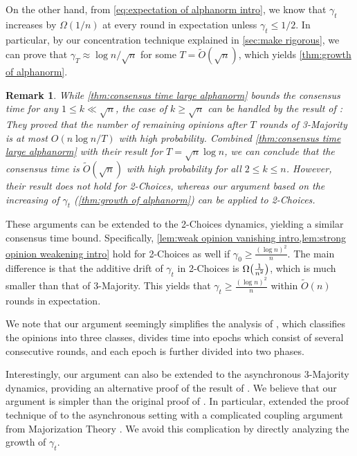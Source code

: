 \documentclass[letterpaper,11pt]{article}
\newtheorem{remark}[theorem]{Remark}
\newcommand{\Otilde}{\widetilde{O}}
\newcommand{\alphanorm}{\gamma}
\begin{document}
On the other hand, from \cref{eq:expectation of alphanorm intro}, we know that $\alphanorm_t$ increases by $\Omega(1/n)$ at every round in expectation unless $\alphanorm_t \le 1/2$.
In particular, by our concentration technique explained in \cref{sec:make rigorous}, we can prove that $\alphanorm_T \approx \log n/\sqrt{n}$ for some $T=\Otilde(\sqrt{n})$, which yields \cref{thm:growth of alphanorm}.


\begin{remark}
  While \cref{thm:consensus time large alphanorm} bounds the consensus time for any $1\le k\ll \sqrt{n}$,
  the case of $k \ge \sqrt{n}$ can be handled by the result of \cite{ignore_or_comply}:
  They proved that the number of remaining opinions after $T$ rounds of 3-Majority is at most $O(n\log n / T)$ with high probability.
  Combined \cref{thm:consensus time large alphanorm} with their result for $T=\sqrt{n}\log n$, we can conclude that the consensus time is $\Otilde(\sqrt{n})$ with high probability for all $2\le k\le n$.
  However, their result does not hold for 2-Choices, whereas our argument based on the increasing of $\alphanorm_t$ (\cref{thm:growth of alphanorm}) can be applied to 2-Choices.
\end{remark}

These arguments can be extended to the 2-Choices dynamics, yielding a similar consensus time bound.
Specifically, \cref{lem:weak opinion vanishing intro,lem:strong opinion weakening intro} hold for 2-Choices as well if $\alphanorm_0 \ge \frac{(\log n)^2}{n}$.
The main difference is that the additive drift of $\alphanorm_t$ in 2-Choices is $\Omega\qty(\frac{1}{n^2})$, which is much smaller than that of 3-Majority.
This yields that $\alphanorm_t \ge \frac{(\log n)^2}{n}$ within $\Otilde(n)$ rounds in expectation.


We note that our argument seemingly simplifies the analysis of \cite{nearly_tight_analysis}, which classifies the opinions into three classes, divides time into epochs which consist of several consecutive rounds, and each epoch is further divided into two phases.

Interestingly, our argument can also be extended to the asynchronous 3-Majority dynamics, providing an alternative proof of the result of \cite{async_3-majority_soda25}.
We believe that our argument is simpler than the original proof of \cite{async_3-majority_soda25}.
In particular, \cite{async_3-majority_soda25} extended the proof technique of \cite{ignore_or_comply} to the asynchronous setting with a complicated coupling argument from Majorization Theory \cite{MOA11}.
We avoid this complication by directly analyzing the growth of $\alphanorm_t$.
\end{document}

